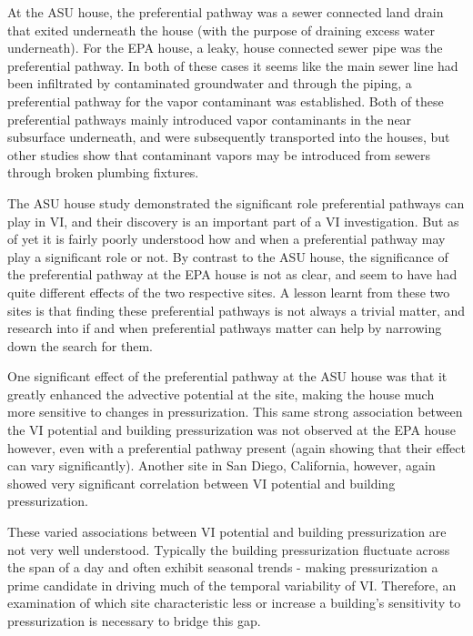 \documentclass[../thesis.tex]{subfiles}
\begin{document}
At the ASU house, the preferential pathway was a sewer connected land drain that exited underneath the house (with the purpose of draining excess water underneath)\cite{guo_identification_2015}.
For the EPA house, a leaky, house connected sewer pipe was the preferential pathway\cite{mchugh_evidence_2017}.
In both of these cases it seems like the main sewer line had been infiltrated by contaminated groundwater and through the piping, a preferential pathway for the vapor contaminant was established.
Both of these preferential pathways mainly introduced vapor contaminants in the near subsurface underneath, and were subsequently transported into the houses, but other studies show that contaminant vapors may be introduced from sewers through broken plumbing fixtures\cite{pennell_sewer_2013,nielsen_remediation_2017}.

The ASU house study demonstrated the significant role preferential pathways can play in VI, and their discovery is an important part of a VI investigation.
But as of yet it is fairly poorly understood how and when a preferential pathway may play a significant role or not.
By contrast to the ASU house, the significance of the preferential pathway at the EPA house is not as clear, and seem to have had quite different effects of the two respective sites.
A lesson learnt from these two sites is that finding these preferential pathways is not always a trivial matter, and research into if and when preferential pathways matter can help by narrowing down the search for them.\par

One significant effect of the preferential pathway at the ASU house was that it greatly enhanced the advective potential at the site, making the house much more sensitive to changes in pressurization\cite{strom_factors_2019,guo_identification_2015,holton_temporal_2013}.
This same strong association between the VI potential and building pressurization was not observed at the EPA house however, even with a preferential pathway present (again showing that their effect can vary significantly).
Another site in San Diego, California, however, again showed very significant correlation between VI potential and building pressurization\cite{hosangadi_high-frequency_2017}.\par

These varied associations between VI potential and building pressurization are not very well understood.
Typically the building pressurization fluctuate across the span of a day and often exhibit seasonal trends - making pressurization a prime candidate in driving much of the temporal variability of VI.
Therefore, an examination of which site characteristic less or increase a building's sensitivity to pressurization is necessary to bridge this gap.\par
\end{document}
